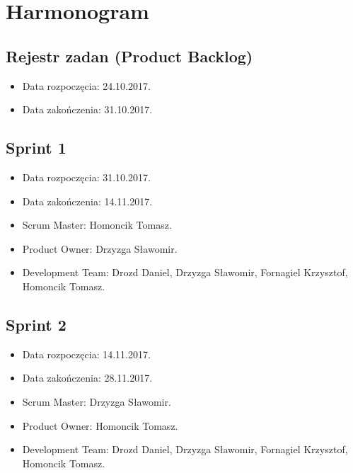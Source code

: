 	


\section{Harmonogram}
	\subsection{Rejestr zadan (Product Backlog)}
	\begin{itemize}
		\item Data rozpoczęcia: 24.10.2017.
		\item  Data zakończenia: 31.10.2017.
	\end{itemize}
	
	\subsection{Sprint 1}
	\begin{itemize}
	\item Data rozpoczęcia: 31.10.2017.
	\item Data zakończenia: 14.11.2017.
	\item Scrum Master: Homoncik Tomasz.
	\item Product Owner: Drzyzga Sławomir.
	\item Development Team: Drozd Daniel, Drzyzga Sławomir, Fornagiel Krzysztof, Homoncik Tomasz.
	\end{itemize}

	\subsection{Sprint 2}
	\begin{itemize}
		\item Data rozpoczęcia: 14.11.2017.
		\item Data zakończenia: 28.11.2017.
		\item Scrum Master: Drzyzga Sławomir.
		\item Product Owner: Homoncik Tomasz.
		\item Development Team: Drozd Daniel, Drzyzga Sławomir, Fornagiel Krzysztof, Homoncik Tomasz.
	\end{itemize}
